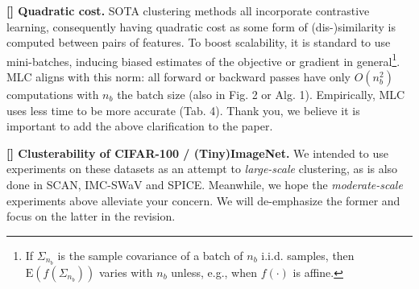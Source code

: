 \documentclass[10pt,twocolumn,letterpaper]{article}
\newcommand{\myparagraph}[1]{\noindent\textbf{#1}}
\newcommand{\Rthree}{{\color{blue}{R3}}}
\begin{document}
\myparagraph{[\Rthree] Quadratic cost.} SOTA clustering methods all incorporate contrastive learning, consequently having quadratic cost as some form of (dis-)similarity is computed between pairs of features. To boost scalability, it is standard to use mini-batches, inducing biased estimates of the objective or gradient in general\footnote{If $\Sigma_{n_b}$ is the sample covariance of a batch of $n_b$ i.i.d. samples, then $\mathrm{E}(f(\Sigma_{n_b}))$ varies with $n_b$ unless, e.g., when $f(\cdot)$ is affine.}. MLC aligns with this norm: all forward or backward passes have only $O(n_b^2)$ computations with $n_b$ the batch size (also in Fig. 2 or Alg. 1). Empirically, MLC uses less time to be more accurate (Tab. 4). Thank you, we believe it is important to add the above clarification to the paper.




\smallskip
\myparagraph{[\Rthree] Clusterability of CIFAR-100 / (Tiny)ImageNet. } We intended to use experiments on these datasets as an attempt to \textit{large-scale} clustering, as is also done in SCAN, IMC-SWaV and SPICE. Meanwhile, we hope the \textit{moderate-scale} experiments above alleviate your concern. We will de-emphasize the former and focus on the latter in the revision. 
\end{document}
